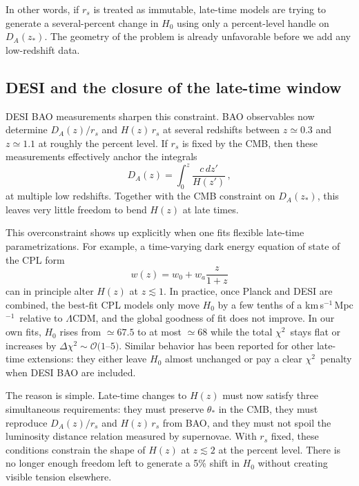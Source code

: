\documentclass[twocolumn,showpacs,preprintnumbers,amsmath,amssymb,prd]{revtex4-2}
\newcommand{\lcdm}{$\Lambda$CDM}
\newcommand{\chisq}{$\chi^2$}
\newcommand{\kms}{km\,s$^{-1}$\,Mpc$^{-1}$}
\begin{document}
In other words, if $r_s$ is treated as immutable, late-time models are trying to 
generate a several-percent change in $H_0$ using only a percent-level handle on 
$D_A(z_\ast)$. The geometry of the problem is already unfavorable before we add 
any low-redshift data.

\subsection{DESI and the closure of the late-time window}

DESI BAO measurements sharpen this constraint. BAO observables now determine 
$D_A(z)/r_s$ and $H(z)\,r_s$ at several redshifts between $z \simeq 0.3$ and 
$z \simeq 1.1$ at roughly the percent level. If $r_s$ is fixed by the CMB, then 
these measurements effectively anchor the integrals
\begin{equation}
  D_A(z) = \int_0^{z} \frac{c\,dz'}{H(z')}\,,
\end{equation}
at multiple low redshifts. Together with the CMB constraint on $D_A(z_\ast)$, 
this leaves very little freedom to bend $H(z)$ at late times.

This overconstraint shows up explicitly when one fits flexible late-time 
parametrizations. For example, a time-varying dark energy equation of state 
of the CPL form
\begin{equation}
  w(z) = w_0 + w_a \frac{z}{1+z}
\end{equation}
can in principle alter $H(z)$ at $z \lesssim 1$. In practice, once Planck and 
DESI are combined, the best-fit CPL models only move $H_0$ by a few tenths of 
a \kms\ relative to \lcdm, and the global goodness of fit does not improve. 
In our own fits, $H_0$ rises from $\simeq 67.5$ to at most $\simeq 68$ while 
the total \chisq\ stays flat or increases by $\Delta\chi^2 \sim \mathcal{O}(1$--$5)$. 
Similar behavior has been reported for other late-time extensions: they either 
leave $H_0$ almost unchanged or pay a clear \chisq\ penalty when DESI BAO are included.

The reason is simple. Late-time changes to $H(z)$ must now satisfy three 
simultaneous requirements: they must preserve $\theta_\ast$ in the CMB, they 
must reproduce $D_A(z)/r_s$ and $H(z)\,r_s$ from BAO, and they must not spoil 
the luminosity distance relation measured by supernovae. With $r_s$ fixed, 
these conditions constrain the shape of $H(z)$ at $z \lesssim 2$ at the percent 
level. There is no longer enough freedom left to generate a 5\% shift in $H_0$ 
without creating visible tension elsewhere.
\end{document}
